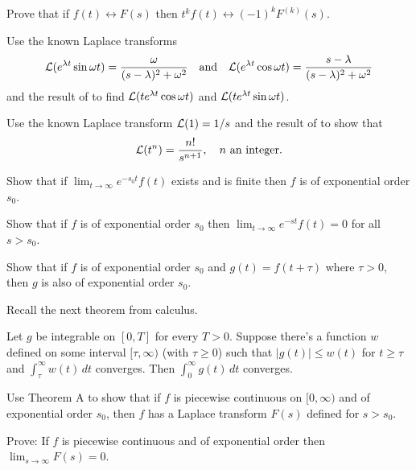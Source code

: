 \begin{exerciselist}
\item\label{exer:8.1.6}Prove that if $f(t)\leftrightarrow F(s)$ then $t^kf(t)\leftrightarrow
(-1)^kF^{(k)}(s)$. 

\item\label{exer:8.1.7}Use the known Laplace transforms
\[
{\mathcal L}(e^{\lambda t}\sin\omega t)=\frac{\omega}{(s-\lambda)^2+\omega^2}
\quad\text{and}\quad
{\mathcal L}(e^{\lambda t}\cos\omega t)=\frac{s-\lambda}{(s-\lambda)^2+\omega^2}
\]
  and the result of  to find
${\mathcal L}(te^{\lambda t}\cos\omega t)$ and
${\mathcal L}(te^{\lambda t}\sin\omega t)$.

\item\label{exer:8.1.8}Use the known Laplace transform ${\mathcal L}(1)=1/s$ and the result of
 to show that
\[
{\mathcal L}(t^n)=\frac{n!}{s^{n+1}},\quad\text{$n$ an integer}.
\]

\item\label{exer:8.1.9}\begin{alist}
\item %
 Show that if $\lim_{t\to\infty} e^{-s_0t} f(t)$ exists and
is finite then  $f$ is of exponential order $s_0$.
\item %
 Show that if $f$ is of exponential order $s_0$ then $\lim_{t
\to\infty} e^{-st} f(t)=0$ for all $s>s_0$.
\item %
Show that if $f$ is of exponential order $s_0$  and $g(t)=f(t+\tau)$
where $\tau>0$, then $g$ is also of exponential order $s_0$.
\end{alist}

\item\label{exer:8.1.10}Recall the next  theorem from calculus.

\begin{theorem*}[A]
Let $g$ be integrable on $[0,T]$ for
every $T>0$.  Suppose there's a function $w$ defined on some
interval $[\tau,\infty)$ (with $\tau\ge 0$) such that $|g(t)|\le
w(t)$ for $t\ge\tau$ and $\int^\infty_\tau w(t)\,dt$
converges.  Then $\int_0^\infty g(t)\,dt$ converges.
\end{theorem*}

Use Theorem A to show that if $f$ is piecewise continuous on
$[0,\infty)$ and of exponential order $s_0$, then $f$ has a Laplace
transform $F(s)$ defined for $s>s_0$.

\item\label{exer:8.1.11}Prove: If $f$ is piecewise continuous and of exponential order
then $\lim_{s\to\infty}F(s)=0$.




\end{exerciselist}
